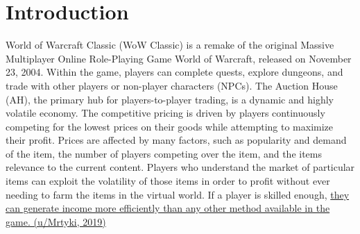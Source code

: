 \documentclass[sigconf]{acmart}
\begin{document}

%

%
\maketitle

\section{Introduction}
World of Warcraft Classic (WoW Classic) is a remake of the original Massive Multiplayer Online Role-Playing Game World of Warcraft, released on November 23, 2004. Within the game, players can complete quests, explore dungeons, and trade with other players or non-player characters (NPCs). The Auction House (AH), the primary hub for players-to-player trading, is a dynamic and highly volatile economy. The competitive pricing is driven by players continuously competing for the lowest prices on their goods while attempting to maximize their profit. Prices are affected by many factors, such as popularity and demand of the item, the number of players competing over the item, and the items relevance to the current content. Players who understand the market of particular items can exploit the volatility of those items in order to profit without ever needing to farm the items in the virtual world. If a player is skilled enough, \href{https://www.reddit.com/r/woweconomy/comments/dgj6yb/ama_made_1000g_in_2_weeks_on_1_character_with_10/}{they can generate income more efficiently than any other method available in the game. (u/Mrtyki, 2019)}
\end{document}
